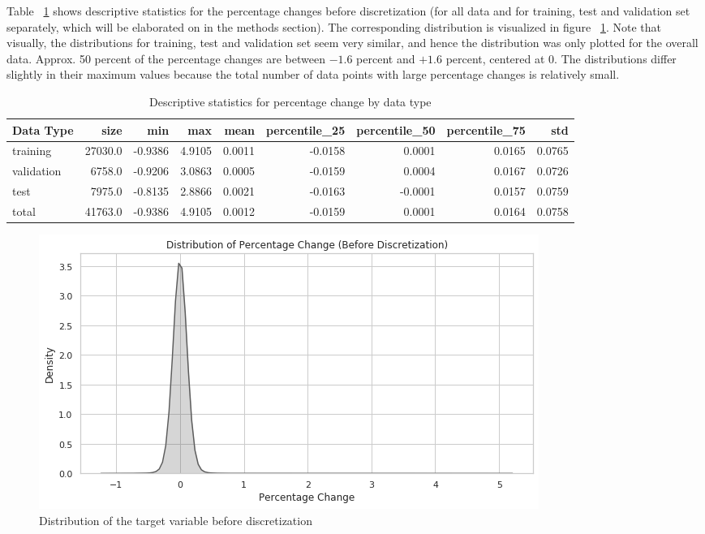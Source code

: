 \documentclass{article}
\begin{document}
	Table ~\ref{table:stats_by_data} shows descriptive statistics for the percentage changes before discretization (for all data and for training, test and validation set separately, which will be elaborated on in the methods section). The corresponding distribution is visualized in figure ~\ref{fig:dist_target_nondisc}. Note that visually, the distributions for training, test and validation set seem very similar, and hence the distribution was only plotted for the overall data. Approx. 50 percent of the percentage changes are between $-1.6$ percent and $+1.6$ percent, centered at $0$. The distributions differ slightly in their maximum values because the total number of data points with large percentage changes is relatively small.

	
		\begin{table}[h!]
		\centering
		\caption{Descriptive statistics for percentage change by data type}
		\label{table:stats_by_data}
		
		\begin{tabular}{lrrrrrrrr}
			\toprule
			Data Type &     size &     min &     max &    mean &  percentile\_25 &  percentile\_50 &  percentile\_75 &     std \\
			\midrule
			training   &  27030.0 & -0.9386 &  4.9105 &  0.0011 &        -0.0158 &         0.0001 &         0.0165 &  0.0765 \\
			validation &   6758.0 & -0.9206 &  3.0863 &  0.0005 &        -0.0159 &         0.0004 &         0.0167 &  0.0726 \\
			test       &   7975.0 & -0.8135 &  2.8866 &  0.0021 &        -0.0163 &        -0.0001 &         0.0157 &  0.0759 \\
			total      &  41763.0 & -0.9386 &  4.9105 &  0.0012 &        -0.0159 &         0.0001 &         0.0164 &  0.0758 \\
			\bottomrule
		\end{tabular}
		
	\end{table}%
	
	
	\begin{figure}[h!]
		\includegraphics[width=\linewidth]{img/dist_target_nondisc.png}
		\caption{Distribution of the target variable before discretization}
		\label{fig:dist_target_nondisc}
	\end{figure}
\end{document}
